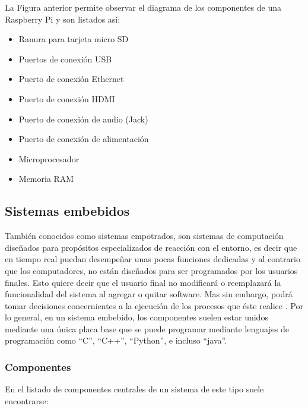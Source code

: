 La Figura anterior permite observar el diagrama de los componentes de una Raspberry Pi y son listados así:
\begin{multicols}{2}
\begin{itemize}
    \item [(1)] Ranura para tarjeta micro SD
    \item [(2)] Puertos de conexión USB
    \item [(3)] Puerto de conexión Ethernet
    \item [(4)] Puerto de conexión HDMI
    \item [(5)] Puerto de conexión de audio (Jack)
    \item [(6)] Puerto de conexión de alimentación
    \item [(7)] Microprocesador
    \item [(8)] Memoria RAM
\end{itemize}
\end{multicols}

\subsection{Sistemas embebidos} \label{subsectionembebidos}

También conocidos como sistemas empotrados, son sistemas de computación diseñados para propósitos especializados de reacción con el entorno, es decir que en tiempo real puedan desempeñar unas pocas funciones dedicadas y al contrario que los computadores, no están diseñados para ser  programados por los usuarios finales. Esto quiere decir que el usuario final no modificará o reemplazará la funcionalidad del sistema al agregar o quitar software. Mas sin embargo, podrá tomar decisiones concernientes a la ejecución de los procesos que éste realice \cite{embebido}. Por lo general, en un sistema embebido, los componentes suelen estar unidos mediante una única placa base que se puede programar mediante lenguajes de programación como ``C'', ``C++'', ``Python'', e incluso ``java''.

\subsubsection{Componentes}

En el listado de componentes centrales de un sistema de este tipo suele encontrarse:

